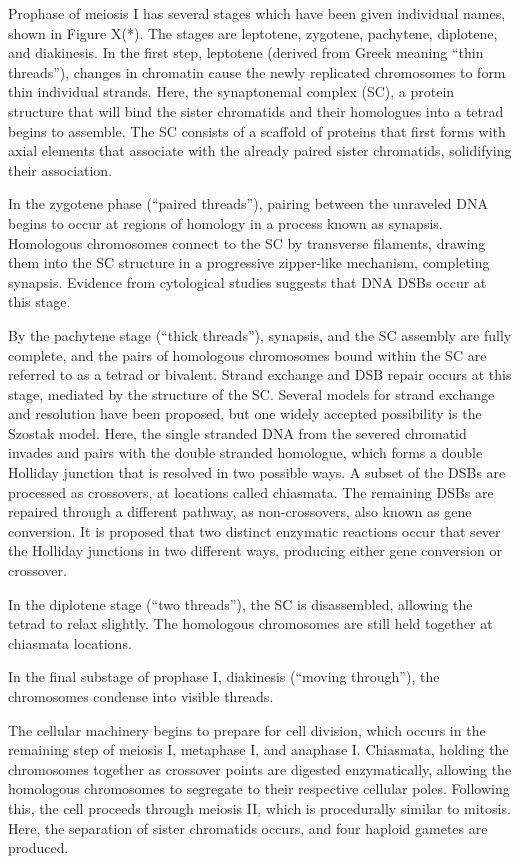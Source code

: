 Prophase of meiosis I has several stages which have been given individual names, shown in Figure X(*).
The stages are leptotene, zygotene, pachytene, diplotene, and diakinesis.
In the first step, leptotene (derived from Greek meaning ``thin threads''), changes in chromatin cause the newly replicated chromosomes to form thin individual strands.
Here, the synaptonemal complex (SC), a protein structure that will bind the sister chromatids and their homologues into a tetrad begins to assemble.
The SC consists of a scaffold of proteins that first forms with axial elements that associate with the already paired sister chromatids, solidifying their association.

In the zygotene phase (``paired threads''), pairing between the unraveled DNA begins to occur at regions of homology in a process known as synapsis.
Homologous chromosomes connect to the SC by transverse filaments, drawing them into the SC structure in a progressive zipper-like mechanism, completing synapsis\cite{Yang2009}.
Evidence from cytological studies suggests that DNA DSBs occur at this stage\cite{Oliver-Bonet2005,Gruhn2013}.

By the pachytene stage (``thick threads''), synapsis, and the SC assembly are fully complete, and the pairs of homologous chromosomes bound within the SC are referred to as a tetrad or bivalent.
Strand exchange and DSB repair occurs at this stage, mediated by the structure of the SC.
Several models for strand exchange and resolution have been proposed, but one widely accepted possibility is the Szostak model.
Here, the single stranded DNA from the severed chromatid invades and pairs with the double stranded homologue, which forms a double Holliday junction that is resolved in two possible ways\cite{Szostak1983}.
A subset of the DSBs are processed as crossovers, at locations called chiasmata.
The remaining DSBs are repaired through a different pathway, as non-crossovers, also known as gene conversion.
It is proposed that two distinct enzymatic reactions occur that sever the Holliday junctions in two different ways, producing either gene conversion or crossover\cite{Baudat2013}.

In the diplotene stage (``two threads''), the SC is disassembled, allowing the tetrad to relax slightly.
The homologous chromosomes are still held together at chiasmata locations.

In the final substage of prophase I, diakinesis (``moving through''), the chromosomes condense into visible threads.

The cellular machinery begins to prepare for cell division, which occurs in the remaining step of meiosis I, metaphase I, and anaphase I.
Chiasmata, holding the chromosomes together as crossover points are digested enzymatically, allowing the homologous chromosomes to segregate to their respective cellular poles.  
Following this, the cell proceeds through meiosis II, which is procedurally similar to mitosis.
Here, the separation of sister chromatids occurs, and four haploid gametes are produced.



